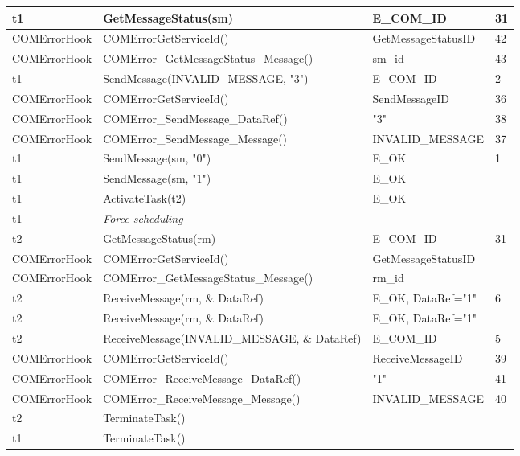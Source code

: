 \documentclass[10pt]{article}
\newlength{\Li}\settowidth{\Li}{Running}
\newlength{\Lii}\setlength{\Lii}{7cm}
\newlength{\Liiii}\setlength{\Liiii}{0.9cm}
\newlength{\Liii}\setlength{\Liii}{\textwidth} \addtolength{\Liii}{-\Li} \addtolength{\Liii}{-\Lii} \addtolength{\Liii}{-\Liiii}
\begin{document}
	\begin{supertabular}{|p{\Li}|p{\Lii}|p{\Liii}|p{\Liiii}|} \hline 
	t1	& GetMessageStatus(sm)								& E\_COM\_ID						& 31 \\ \hline 
	COMErrorHook		& COMErrorGetServiceId()				& GetMessageStatusID				& 42 \\ \hline
	COMErrorHook		& COMError\_GetMessageStatus\_Message()	& sm\_id							& 43 \\ \hline	
	t1	& SendMessage(INVALID\_MESSAGE, "3") 				& E\_COM\_ID						& 2  \\ \hline  
	COMErrorHook		& COMErrorGetServiceId()				& SendMessageID					& 36 \\ \hline
	COMErrorHook		& COMError\_SendMessage\_DataRef()		& "3"								& 38 \\ \hline
	COMErrorHook		& COMError\_SendMessage\_Message()		& INVALID\_MESSAGE				& 37 \\ \hline
	t1	& SendMessage(sm, "0") 								& E\_OK							& 1 \\ \hline  
	t1	& SendMessage(sm, "1") 								& E\_OK							&  \\ \hline  
	t1 	& ActivateTask(t2)									& E\_OK							& \\ \hline 
	t1	& \textit{Force scheduling}							&								& \\ \hline
	t2	& GetMessageStatus(rm)								& E\_COM\_ID						& 31 \\ \hline 
	COMErrorHook		& COMErrorGetServiceId()				& GetMessageStatusID				& \\ \hline
	COMErrorHook		& COMError\_GetMessageStatus\_Message()	& rm\_id							& \\ \hline	
	t2	& ReceiveMessage(rm, \& DataRef)						& E\_OK, DataRef="1"				& 6 \\ \hline 
	t2	& ReceiveMessage(rm, \& DataRef)						& E\_OK, DataRef="1"				& \\ \hline 
	t2	& ReceiveMessage(INVALID\_MESSAGE, \& DataRef)		& E\_COM\_ID						& 5 \\ \hline 
	COMErrorHook		& COMErrorGetServiceId()				& ReceiveMessageID				& 39 \\ \hline
	COMErrorHook		& COMError\_ReceiveMessage\_DataRef()	& "1"								& 41 \\ \hline
	COMErrorHook		& COMError\_ReceiveMessage\_Message()	& INVALID\_MESSAGE				& 40 \\ \hline
	t2 	& TerminateTask() 									& 								& \\ \hline 
	t1	& TerminateTask()									&								& \\ \hline 
	\end{supertabular}\\
\end{document}
